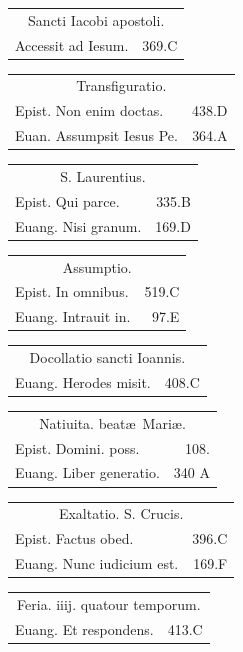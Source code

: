 \documentclass[a5paper,10pt]{book}
\def\ae{æ}
\begin{document}
\begin{multicols}{2}
\begin{tabular}{l r}
\end{tabular}
\begin{tabular}{l r}
\multicolumn{2}{c}{\color{red} Sancti Iacobi apostoli.}\\
Accessit ad Iesum. & 369.C\\
\end{tabular}
\begin{tabular}{l r}
\multicolumn{2}{c}{\color{red} Transfiguratio.}\\
Epist. Non enim doctas. & 438.D\\
Euan. Assumpsit Iesus Pe. & 364.A\\
\end{tabular}
\begin{tabular}{l r}
\multicolumn{2}{c}{\color{red} S. Laurentius.}\\
Epist. Qui parce. & 335.B\\
Euang. Nisi granum. & 169.D\\
\end{tabular}
\begin{tabular}{l r}
\multicolumn{2}{c}{\color{red} Assumptio.}\\
Epist. In omnibus. & 519.C\\
Euang. Intrauit in. & 97.E\\
\end{tabular}
\begin{tabular}{l r}
\multicolumn{2}{c}{\color{red} Docollatio sancti Ioannis.}\\
Euang. Herodes misit. & 408.C\\
\end{tabular}
\begin{tabular}{l r}
\multicolumn{2}{c}{\color{red} Natiuita. beat\ae \ Mari\ae .}\\
Epist. Domini. poss. & 108.\\
Euang. Liber generatio. & 340 A\\%
\end{tabular}
\begin{tabular}{l r}
\multicolumn{2}{c}{\color{red} Exaltatio. S. Crucis.}\\
Epist. Factus obed. & 396.C\\
Euang. Nunc iudicium est. & 169.F\\
\end{tabular}
\begin{tabular}{l r}
\multicolumn{2}{c}{\color{red} Feria. iiij. quatour temporum.}\\
Euang. Et respondens. & 413.C\\

\end{tabular}
\end{multicols}
\end{document}
